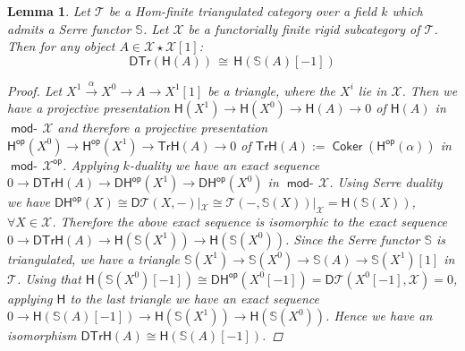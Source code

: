 \documentclass[oneside, a4paper,reqno]{amsart}
\numberwithin{equation}{section}
\newtheorem{lem}[thm]{Lemma}
\theoremstyle{definition}
\begin{document}
\begin{lem} Let ${\mathcal T}$ be a Hom-finite triangulated category over a field $k$ which admits a Serre functor $\mathbb S$. Let ${\mathcal X}$ be a functorially finite rigid subcategory of ${\mathcal T}$. Then for any object $A\in {\mathcal X} \star {\mathcal X}[1]$: 
\[
\mathsf{DTr}(\mathsf{H}(A)) \,  \cong \,  \mathsf{H}(\mathbb S(A)[-1])
\]  
\begin{proof} Let $X^{1} \stackrel{\alpha}{\longrightarrow} X^{0} {\longrightarrow} A {\longrightarrow} X^{1}[1]$ be a triangle, where the $X^{i}$ lie in ${\mathcal X}$. Then we have a projective presentation $\mathsf{H}(X^{1}) {\longrightarrow} \mathsf{H}(X^{0}) {\longrightarrow} \mathsf{H}(A) {\longrightarrow} 0$ of $\mathsf{H}(A)$ in $\operatorname*{\mathsf{mod}-\!}{\mathcal X}$  and therefore a projective presentation $\mathsf{H}^\operatorname*{\mathsf{op}}(X^{0}) {\longrightarrow} \mathsf{H}^\operatorname*{\mathsf{op}}(X^{1}) {\longrightarrow} \mathsf{Tr}\mathsf{H}(A) {\longrightarrow} 0$ of $\mathsf{Tr}\mathsf{H}(A) := \operatorname*{\mathsf{Coker}}(\mathsf{H}^\operatorname*{\mathsf{op}}(\alpha))$ in $\operatorname*{\mathsf{mod}-\!}{\mathcal X}^\operatorname*{\mathsf{op}}$. Applying $k$-duality we have an exact sequence $0 {\longrightarrow} \mathsf{DTr}\mathsf{H}(A) {\longrightarrow}  \mathsf{D}\mathsf{H}^\operatorname*{\mathsf{op}}(X^{1}) {\longrightarrow}  \mathsf{D}\mathsf{H}^\operatorname*{\mathsf{op}}(X^{0})$ in $\operatorname*{\mathsf{mod}-\!}{\mathcal X}$. Using Serre duality we have $\mathsf{D}\mathsf{H}^\operatorname*{\mathsf{op}}(X) \cong \mathsf{D}{\mathcal T}(X,-)|_{\mathcal X} \cong {\mathcal T}(-,\mathbb S(X))|_{\mathcal X} = \mathsf{H}(\mathbb S(X))$, $\forall X \in {\mathcal X}$.  Therefore the above exact sequence is isomorphic to the exact sequence  $0 {\longrightarrow} \mathsf{DTr}\mathsf{H}(A) {\longrightarrow} \mathsf{H}(\mathbb S(X^{1})) {\longrightarrow} \mathsf{H}(\mathbb S(X^{0}))$. Since the Serre functor $\mathbb S$ is triangulated, we have a triangle $\mathbb S(X^{1}) {\longrightarrow} \mathbb S(X^{0}) {\longrightarrow} \mathbb S(A) {\longrightarrow} \mathbb S(X^{1})[1]$ in ${\mathcal T}$.  Using that $\mathsf{H}(\mathbb S(X^{0})[-1]) \cong \mathsf{D}\mathsf{H}^\operatorname*{\mathsf{op}}(X^{0}[-1]) = \mathsf{D}{\mathcal T}(X^{0}[-1],{\mathcal X}) = 0$, applying $\mathsf{H}$ to the last triangle we have an exact sequence $0 {\longrightarrow} \mathsf{H}(\mathbb S(A)[-1]) {\longrightarrow} \mathsf{H}(\mathbb S(X^{1})) {\longrightarrow} \mathsf{H}(\mathbb S(X^{0}))$. Hence we have an isomorphism $\mathsf{DTr}\mathsf{H}(A) \cong \mathsf{H}(\mathbb S(A)[-1])$.
\end{proof}
\end{lem}
\end{document}
